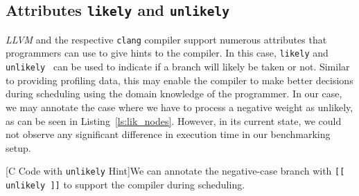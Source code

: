 \subsection{Attributes \texttt{likely} and \texttt{unlikely}}
\textit{LLVM} and the respective \texttt{clang} compiler support numerous attributes that programmers can use to give hints to the compiler. In this case, \texttt{likely} and \texttt{unlikely}~\cite{clangsupportedsyntaxes} can be used to indicate if a branch will likely be taken or not. Similar to providing profiling data, this may enable the compiler to make better decisions during scheduling using the domain knowledge of the programmer. In our case, we may annotate the case where we have to process a negative weight as unlikely, as can be seen in Listing~\ref{ls:lik_nodes}. However, in its current state, we could not observe any significant difference in execution time in our benchmarking setup. 
\begin{center}
        
        \captionsetup{type=Listing}
        [C Code with \texttt{unlikely} Hint]{We can annotate the negative-case branch with \texttt{[[ unlikely ]]} to support the compiler during scheduling.}
        \label{ls:lik_nodes}
\end{center}
\newpage

